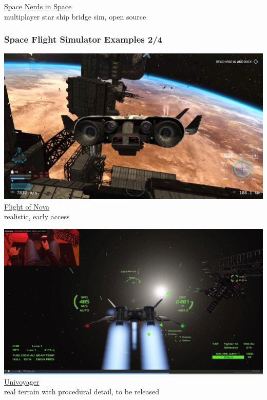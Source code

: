 \documentclass[aspectratio=169,11pt,xcolor=dvipsnames]{beamer}
\begin{document}
\begin{frame}
\begin{minipage}[t]{0.49\textwidth}
\begin{center}
      \href{https://smcameron.github.io/space-nerds-in-space/}{Space Nerds in Space}\\
      multiplayer star ship bridge sim, open source
    \end{center}
  \end{minipage}
\end{frame}

\begin{frame}
  \frametitle{Space Flight Simulator Examples 2/4}
  \begin{minipage}[t]{0.49\textwidth}
    \begin{center}
      \includegraphics[width=\textwidth]{flight-of-nova}\\
      \href{https://flight-of-nova.com/}{Flight of Nova}\\
      realistic, early access
    \end{center}
  \end{minipage}
  \begin{minipage}[t]{0.49\textwidth}
    \begin{center}
      \includegraphics[width=\textwidth]{univoyager}\\
      \href{https://www.univoyager.com/}{Univoyager}\\
      real terrain with procedural detail, to be released
    \end{center}
  \end{minipage}
\end{frame}
\end{document}
